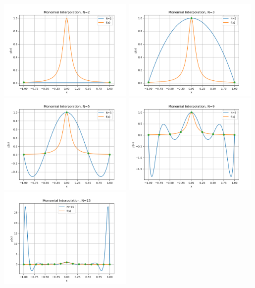 \documentclass[10pt]{article}
\begin{document}
\begin{enumerate}
\begin{enumerate}
  \includegraphics[width=0.49\textwidth]{mono2.png}
  \includegraphics[width=0.49\textwidth]{mono3.png}
  \includegraphics[width=0.49\textwidth]{mono5.png}
  \includegraphics[width=0.49\textwidth]{mono9.png}
  \includegraphics[width=0.49\textwidth]{mono15.png}

\end{enumerate}
\end{enumerate}
\end{document}
